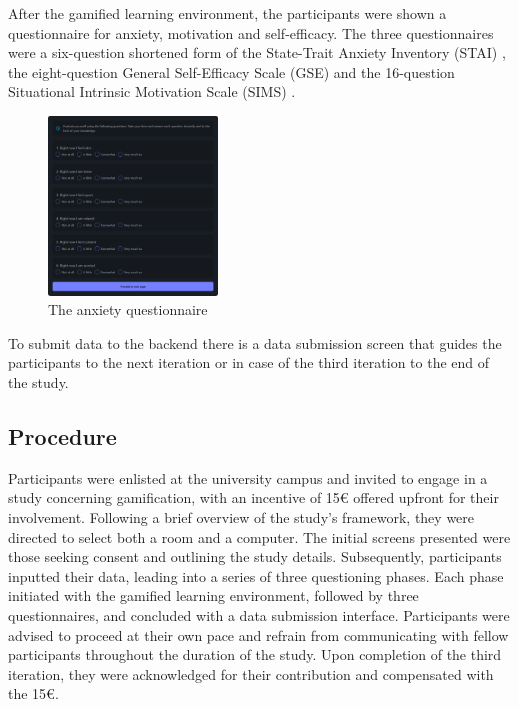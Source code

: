 After the gamified learning environment, the participants were shown a questionnaire for anxiety, motivation and self-efficacy.
The three questionnaires were a six-question shortened form of the State-Trait Anxiety Inventory (STAI) \parencite{marteauDevelopmentSixitemShortform1992}, the eight-question General Self-Efficacy Scale (GSE) \parencite{guayAssessmentSituationalIntrinsic2000} and the 16-question Situational Intrinsic Motivation Scale (SIMS) \parencite{chenValidationNewGeneral2001}.
\begin{figure}[H]
  \centering
  \includegraphics[width=0.4\textwidth]{img/Stai.png}
  \caption{The anxiety questionnaire}
  \label{fig:figureAnxiety}
\end{figure}
To submit data to the backend there is a data submission screen that guides the participants to the next iteration or in case of the third iteration to the end of the study.

\subsection{Procedure}
Participants were enlisted at the university campus and invited to engage in a study concerning gamification, with an incentive of 15€ offered upfront for their involvement.
Following a brief overview of the study's framework, they were directed to select both a room and a computer.
The initial screens presented were those seeking consent and outlining the study details. Subsequently, participants inputted their data, leading into a series of three questioning phases.
Each phase initiated with the gamified learning environment, followed by three questionnaires, and concluded with a data submission interface.
Participants were advised to proceed at their own pace and refrain from communicating with fellow participants throughout the duration of the study.
Upon completion of the third iteration, they were acknowledged for their contribution and compensated with the 15€.

